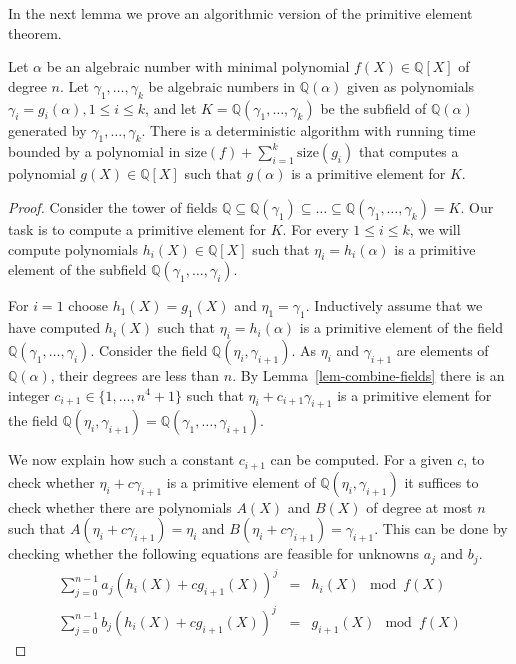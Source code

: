 \documentclass[prodmod,acmtalg]{acmsmall}
\newcommand{\size}[1]{{\ensuremath{\mathrm{size}\left(#1\right)}}}
\newcommand{\Q}{\ensuremath{\mathbb{Q}}}
\begin{document}
In the next lemma we prove an algorithmic version of the primitive
element theorem.

\begin{lemma}\label{lem-primitive-element}
  Let $\alpha$ be an algebraic number with minimal polynomial
  $f(X)\in\Q[X]$ of degree $n$. Let $\gamma_1,\ldots,\gamma_k$ be
  algebraic numbers in $\Q(\alpha)$ given as polynomials
  $\gamma_i=g_i(\alpha), 1\leq i\leq k$, and let
  $K=\Q(\gamma_1,\ldots,\gamma_k)$ be the subfield of $\Q(\alpha)$
  generated by $\gamma_1,\ldots,\gamma_k$. There is a deterministic
  algorithm with running time bounded by a polynomial in
  $\size{f}+\sum_{i=1}^k\size{g_i}$ that computes a polynomial
  $g(X)\in\Q[X]$ such that $g(\alpha)$ is a primitive element for $K$.
\end{lemma}

\begin{proof}
  Consider the tower of fields $\Q\subseteq
  \Q(\gamma_1)\subseteq\ldots \subseteq \Q(\gamma_1,\ldots,\gamma_k) =
  K$.  Our task is to compute a primitive element for $K$. For every
  $1\leq i \leq k$, we will compute polynomials $h_i(X)\in\Q[X]$ such
  that $\eta_i = h_i(\alpha)$ is a primitive element of the subfield
  $\Q(\gamma_1,\ldots,\gamma_i)$.

  For $i = 1$ choose $h_1(X) = g_1(X)$ and $\eta_1 = \gamma_1$.
  Inductively assume that we have computed $h_i(X)$ such that $\eta_i
  = h_i(\alpha)$ is a primitive element of the field
  $\Q(\gamma_1,\ldots,\gamma_i)$. Consider the field
  $\Q(\eta_i,\gamma_{i+1})$. As $\eta_i$ and $\gamma_{i+1}$ are
  elements of $\Q(\alpha)$, their degrees are less than $n$. By
  Lemma~\ref{lem-combine-fields} there is an integer
  $c_{i+1}\in\{1,\ldots,n^4+1\}$ such that $\eta_i +
  c_{i+1}\gamma_{i+1}$ is a primitive element for the field
  $\Q(\eta_i,\gamma_{i+1}) = \Q(\gamma_1,\ldots,\gamma_{i+1})$.

  We now explain how such a constant $c_{i+1}$ can be computed.  For a
  given $c$, to check whether $\eta_i + c \gamma_{i+1}$ is a primitive
  element of $\Q(\eta_i,\gamma_{i+1})$ it suffices to check whether
  there are polynomials $A(X)$ and $B(X)$ of degree at most $n$ such
  that $A(\eta_i + c\gamma_{i+1}) = \eta_i$ and $B(\eta_i + c
  \gamma_{i+1}) = \gamma_{i+1}$. This can be done by checking whether
  the following equations are feasible for unknowns $a_j$ and $b_j$.
  \begin{eqnarray*}
    \sum_{j=0}^{n-1} a_j (h_i(X)+ cg_{i+1}(X))^j & = & h_i(X) \mod{f(X)}\\
    \sum_{j=0}^{n-1} b_j (h_i(X)+ cg_{i+1}(X))^j & = & g_{i+1}(X) \mod{f(X)}
  \end{eqnarray*}


\end{proof}
\end{document}
